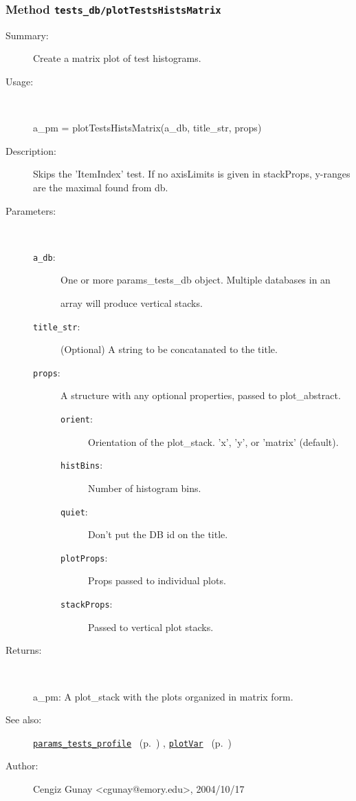 \subsubsection[Method \texttt{plotTestsHistsMatrix}]{Method \texttt{tests\_db/plotTestsHistsMatrix}}%
%
\label{ref_tests_db__plotTestsHistsMatrix}%
\hypertarget{ref_tests_db__plotTestsHistsMatrix}{}%
\begin{description}
\item[Summary:]Create a matrix plot of test histograms.
%
\item[Usage:]~%
\begin{lyxcode}%
a\_pm = plotTestsHistsMatrix(a\_db, title\_str, props)
%
\end{lyxcode}%
%
\item[Description:]%
Skips the 'ItemIndex' test. If no axisLimits is given in stackProps, 
 y-ranges are the maximal found from db.
\item[Parameters:]~
\begin{description}%
\item[\texttt{a\_db}:]
 One or more params\_tests\_db object. Multiple databases in an

array will produce vertical stacks.
\item[\texttt{title\_str}:]
 (Optional) A string to be concatanated to the title.
\item[\texttt{props}:]
 A structure with any optional properties, passed to plot\_abstract.
\begin{description}%
\item[\texttt{orient}:]
 Orientation of the plot\_stack. 'x', 'y', or 'matrix' (default).
\item[\texttt{histBins}:]
 Number of histogram bins.
\item[\texttt{quiet}:]
 Don't put the DB id on the title.
\item[\texttt{plotProps}:]
 Props passed to individual plots.
\item[\texttt{stackProps}:]
 Passed to vertical plot stacks.
\end{description}%
\end{description}%
%
\item[Returns:
]~

   a\_pm: A plot\_stack with the plots organized in matrix form.
%
%
\item[See also:]%
\hyperlink{ref_params_tests_profile}{\texttt{params\_tests\_profile}}%
\ (p.~\pageref{ref_params_tests_profile})%
%
, \hyperlink{ref_plotVar}{\texttt{plotVar}}%
\ (p.~\pageref{ref_plotVar})%
%
%
\item[Author:]%
Cengiz Gunay <cgunay@emory.edu>, 2004/10/17
%
\end{description}
\methodline%
